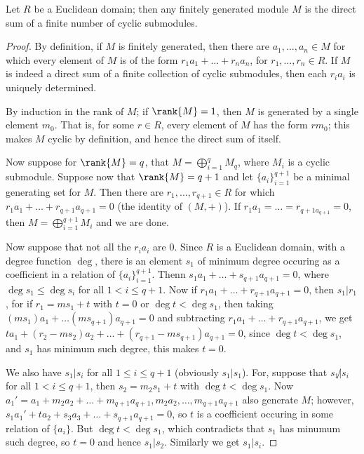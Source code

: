 \begin{theorem}
    Let $R$ be a Euclidean domain; then any finitely generated module  $M$ is the direct sum of a
    finite number of cyclic submodules.
\end{theorem}
\begin{proof}
    By definition, if $M$ is finitely generated, then there are  $a_1, \dots, a_n \in M$ for which
    every element of $M$ is of the form  $r_1a_1+\dots+r_na_n$, for $r_1, \dots, r_n \in R.$ If $M$
    is indeed a direct sum of a finite collection of cyclic submodules, then each  $r_ia_i$ is
    uniquely determined.

    By induction in the rank of $M$; if  $\rank{M}=1$, then $M$ is generated by a single element
    $m_0$. That is, for some $r \in R$, every element of  $M$ has the form  $rm_0$; this makes $M$
    cyclic by definition, and hence the direct sum of itself.

    Now suppose for  $\rank{M}=q$, that $M=\bigoplus_{i=1}^q{M_q}$, where $M_i$ is a cyclic
    submodule. Suppose now that  $\rank{M}=q+1$ and let $\{a_i\}_{i=1}^{q+1}$ be a minimal
    generating set for $M$. Then there are  $r_1, \dots, r_{q+1} \in R$ for which
    $r_1a_1+\dots+r_{q+1}a_{q+1}=0$ (the identity of $(M,+)$). If $r_1a_1=\dots=r_{q+1a_{q+1}}=0$,
    then $M=\bigoplus_{i=1}^{q+1}{M_i}$ and we are done.

    Now suppose that not all the $r_ia_i$ are  $0$. Since  $R$ is a Euclidean domain, with a degree
    function $\deg$, there is an element  $s_1$ of minimum degree occuring as a coefficient in a
    relation of  $\{a_i\}_{i=1}^{q+1}$. Thenn $s_1a_1+\dots+s_{q+1}a_{q+1}=0$, where $\deg{s_1} \leq 
    \deg{s_i}$ for all $1<i\leq q+1$. Now if  $r_1a_1+\dots+r_{q+1}a_{q+1}=0$, then $s_1|r_1$, for
    if $r_1=ms_1+t$ with $t=0$ or  $\deg{t}<\deg{s_1}$, then taking
    $(ms_1)a_1+\dots(ms_{q+1})a_{q+1}=0$ and subtracting $r_1a_1+\dots+r_{q+1}a_{q+1}$, we get
    $ta_1+(r_2-ms_2)a_2+\dots+(r_{q+1}-ms_{q+1})a_{q+1}=0$, since $\deg{t} < \deg{s_1}$, and $s_1$
    has minimum such degree, this makes $t=0$. 

    We also have $s_1|s_i$ for all $1 \leq i \leq q+1$  (obviously $s_1|s_1$). For, suppose that
    $s_1 \not|s_i$ for all $1<i\leq q+1$, then  $s_2=m_2s_1+t$ with $\deg{t}<\deg{s_1}$. Now
    $a_1'=a_1+m_2a_2+\dots+m_{q+1}a_{q+1}, m_2a_2, \dots, m_{q+1}a_{q+1}$ also generate $M$;
    however, $s_1a_1'+ta_2+s_3a_3+\dots+s_{q+1}a_{q+1}=0$, so $t$ is a coefficient occuring in some
    relation of $\{a_i\}$. But $\deg{t}<\deg{s_1}$, which contradicts that $s_1$ has minumum such
    degree, so $t=0$ and hence  $s_1|s_2$. Similarly we get $s_1|s_i$.


\end{proof}

